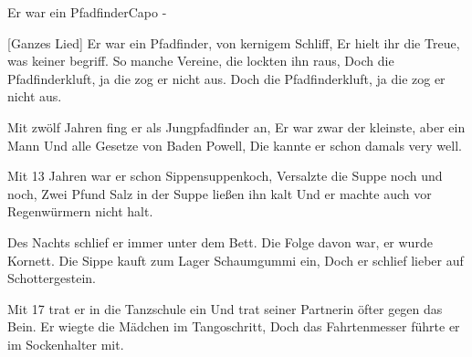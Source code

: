 \begin{song}{Er war ein Pfadfinder}{}{Capo -}

[Ganzes Lied]
Er war ein Pfadfinder, von kernigem Schliff,
Er hielt ihr die Treue, was keiner begriff.
So manche Vereine, die lockten ihn raus,
Doch die Pfadfinderkluft, ja die zog er nicht aus.
Doch die Pfadfinderkluft, ja die zog er nicht aus.

Mit zwölf Jahren fing er als Jungpfadfinder an,
Er war zwar der kleinste, aber ein Mann
Und alle Gesetze von Baden Powell,
Die kannte er schon damals very well.

 

Mit 13 Jahren war er schon Sippensuppenkoch,
Versalzte die Suppe noch und noch,
Zwei Pfund Salz in der Suppe ließen ihn kalt
Und er machte auch vor Regenwürmern nicht halt.

 

Des Nachts schlief er immer unter dem Bett.
Die Folge davon war, er wurde Kornett.
Die Sippe kauft zum Lager Schaumgummi ein,
Doch er schlief lieber auf Schottergestein.

 


Mit 17 trat er in die Tanzschule ein
Und trat seiner Partnerin öfter gegen das Bein.
Er wiegte die Mädchen im Tangoschritt,
Doch das Fahrtenmesser führte er im Sockenhalter mit.

 


\end{song}
